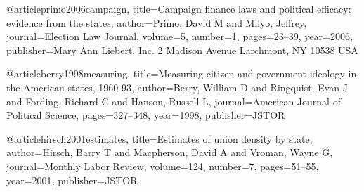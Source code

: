 @article{primo2006campaign,
  title={Campaign finance laws and political efficacy: evidence from the states},
  author={Primo, David M and Milyo, Jeffrey},
  journal={Election Law Journal},
  volume={5},
  number={1},
  pages={23--39},
  year={2006},
  publisher={Mary Ann Liebert, Inc. 2 Madison Avenue Larchmont, NY 10538 USA}
}

@article{berry1998measuring,
  title={Measuring citizen and government ideology in the American states, 1960-93},
  author={Berry, William D and Ringquist, Evan J and Fording, Richard C and Hanson, Russell L},
  journal={American Journal of Political Science},
  pages={327--348},
  year={1998},
  publisher={JSTOR}
}

@article{hirsch2001estimates,
  title={Estimates of union density by state},
  author={Hirsch, Barry T and Macpherson, David A and Vroman, Wayne G},
  journal={Monthly Labor Review},
  volume={124},
  number={7},
  pages={51--55},
  year={2001},
  publisher={JSTOR}
}